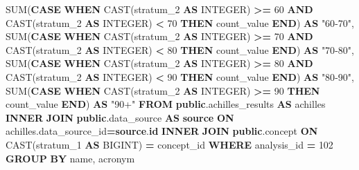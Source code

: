 \documentclass[
]{book}
\newenvironment{Shaded}{\begin{snugshade}}{\end{snugshade}}
\newcommand{\ControlFlowTok}[1]{\textcolor[rgb]{0.13,0.29,0.53}{\textbf{#1}}}
\newcommand{\DataTypeTok}[1]{\textcolor[rgb]{0.13,0.29,0.53}{#1}}
\newcommand{\DecValTok}[1]{\textcolor[rgb]{0.00,0.00,0.81}{#1}}
\newcommand{\FunctionTok}[1]{\textcolor[rgb]{0.00,0.00,0.00}{#1}}
\newcommand{\KeywordTok}[1]{\textcolor[rgb]{0.13,0.29,0.53}{\textbf{#1}}}
\newcommand{\NormalTok}[1]{#1}
\newcommand{\OperatorTok}[1]{\textcolor[rgb]{0.81,0.36,0.00}{\textbf{#1}}}
\newcommand{\OtherTok}[1]{\textcolor[rgb]{0.56,0.35,0.01}{#1}}
\begin{document}
\begin{Shaded}
\begin{Highlighting}[]
       \FunctionTok{SUM}\NormalTok{(}\ControlFlowTok{CASE} \ControlFlowTok{WHEN} \FunctionTok{CAST}\NormalTok{(stratum\_2 }\KeywordTok{AS} \DataTypeTok{INTEGER}\NormalTok{) }\OperatorTok{\textgreater{}=} \DecValTok{60} \KeywordTok{AND} \FunctionTok{CAST}\NormalTok{(stratum\_2 }\KeywordTok{AS} \DataTypeTok{INTEGER}\NormalTok{) }\OperatorTok{\textless{}} \DecValTok{70} \ControlFlowTok{THEN}\NormalTok{ count\_value }\ControlFlowTok{END}\NormalTok{) }\KeywordTok{AS} \OtherTok{"60{-}70"}\NormalTok{,}
       \FunctionTok{SUM}\NormalTok{(}\ControlFlowTok{CASE} \ControlFlowTok{WHEN} \FunctionTok{CAST}\NormalTok{(stratum\_2 }\KeywordTok{AS} \DataTypeTok{INTEGER}\NormalTok{) }\OperatorTok{\textgreater{}=} \DecValTok{70} \KeywordTok{AND} \FunctionTok{CAST}\NormalTok{(stratum\_2 }\KeywordTok{AS} \DataTypeTok{INTEGER}\NormalTok{) }\OperatorTok{\textless{}} \DecValTok{80} \ControlFlowTok{THEN}\NormalTok{ count\_value }\ControlFlowTok{END}\NormalTok{) }\KeywordTok{AS} \OtherTok{"70{-}80"}\NormalTok{,}
       \FunctionTok{SUM}\NormalTok{(}\ControlFlowTok{CASE} \ControlFlowTok{WHEN} \FunctionTok{CAST}\NormalTok{(stratum\_2 }\KeywordTok{AS} \DataTypeTok{INTEGER}\NormalTok{) }\OperatorTok{\textgreater{}=} \DecValTok{80} \KeywordTok{AND} \FunctionTok{CAST}\NormalTok{(stratum\_2 }\KeywordTok{AS} \DataTypeTok{INTEGER}\NormalTok{) }\OperatorTok{\textless{}} \DecValTok{90} \ControlFlowTok{THEN}\NormalTok{ count\_value }\ControlFlowTok{END}\NormalTok{) }\KeywordTok{AS} \OtherTok{"80{-}90"}\NormalTok{,}
       \FunctionTok{SUM}\NormalTok{(}\ControlFlowTok{CASE} \ControlFlowTok{WHEN} \FunctionTok{CAST}\NormalTok{(stratum\_2 }\KeywordTok{AS} \DataTypeTok{INTEGER}\NormalTok{) }\OperatorTok{\textgreater{}=} \DecValTok{90} \ControlFlowTok{THEN}\NormalTok{ count\_value }\ControlFlowTok{END}\NormalTok{) }\KeywordTok{AS} \OtherTok{"90+"}
\KeywordTok{FROM} \KeywordTok{public}\NormalTok{.achilles\_results }\KeywordTok{AS}\NormalTok{ achilles}
\KeywordTok{INNER} \KeywordTok{JOIN} \KeywordTok{public}\NormalTok{.data\_source }\KeywordTok{AS} \KeywordTok{source} \KeywordTok{ON}\NormalTok{ achilles.data\_source\_id}\OperatorTok{=}\KeywordTok{source}\NormalTok{.}\KeywordTok{id}
\KeywordTok{INNER} \KeywordTok{JOIN} \KeywordTok{public}\NormalTok{.concept }\KeywordTok{ON} \FunctionTok{CAST}\NormalTok{(stratum\_1 }\KeywordTok{AS}\NormalTok{ BIGINT) }\OperatorTok{=}\NormalTok{ concept\_id}
\KeywordTok{WHERE}\NormalTok{ analysis\_id }\OperatorTok{=} \DecValTok{102}
\KeywordTok{GROUP} \KeywordTok{BY}\NormalTok{ name, acronym}
\end{Highlighting}
\end{Shaded}
\end{document}
